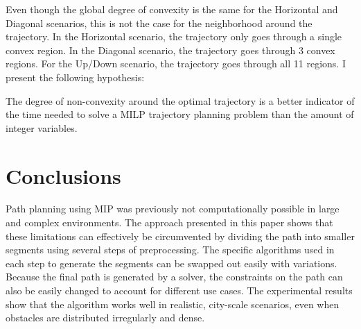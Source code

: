 Even though the global degree of convexity is the same for the Horizontal and Diagonal scenarios, this is not the case for the neighborhood around the trajectory. In the Horizontal scenario, the trajectory only goes through a single convex region. In the Diagonal scenario, the trajectory goes through 3 convex regions. For the Up/Down scenario, the trajectory goes through all 11 regions. I present the following hypothesis:
\begin{hyp}
The degree of non-convexity around the optimal trajectory is a better indicator of the time needed to solve a MILP trajectory planning problem than the amount of integer variables.
\label{hyp:nonconvex}
\end{hyp}



\section{Conclusions}
\label{section:conclusions}
Path planning using MIP was previously not computationally possible in large and complex environments. The approach presented in this paper shows that these limitations can effectively be circumvented by dividing the path into smaller segments using several steps of preprocessing. The specific algorithms used in each step to generate the segments can be swapped out easily with variations. Because the final path is generated by a solver, the constraints on the path can also be easily changed to account for different use cases. The experimental results show that the algorithm works well in realistic, city-scale scenarios, even when obstacles are distributed irregularly and dense.
